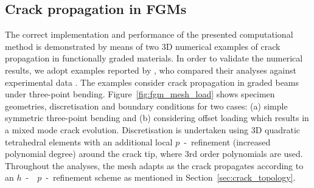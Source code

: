 \documentclass[onecolumn]{svjour3}
\begin{document}
\subsection{Crack propagation in FGMs} \label{sec:crack_propagation_FGM} 
% 
The correct implementation and performance of the presented computational method is demonstrated by means of two 3D numerical examples of crack propagation in functionally graded materials. In order to validate the numerical results, we adopt examples reported by \cite{kim2004simulation}, who compared their analyses against experimental data \cite{galvez1996crack, rousseau2000compositionally}. The examples consider crack propagation in graded beams under three-point bending. Figure~\ref{fig:fgm_mesh_load} shows specimen geometries, discretisation and boundary conditions for two cases: (a) simple symmetric three-point bending and (b) considering offset loading which results in a mixed mode crack evolution. Discretisation is undertaken using 3D quadratic tetrahedral elements with an additional local $p$~-~refinement (increased polynomial degree) around the crack tip, where 3rd order polynomials are used.
Throughout the analyses, the mesh adapts as the crack propagates according to an $h$~-~~$p$~-~refinement scheme as mentioned in Section~\ref{sec:crack_topology}.
\end{document}
